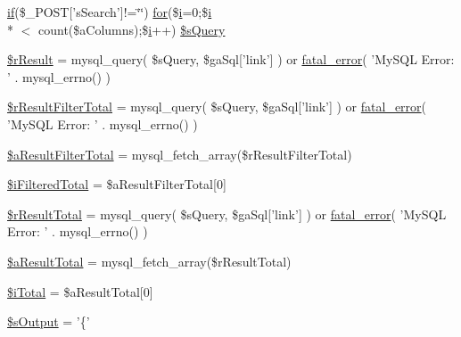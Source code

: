\begin{DoxyCompactItemize}
\item 
\hyperlink{fullpage_2plugin_8js_a8b98017e64ef036adb9ae327ff94abe1}{if}(\$\+\_\+\+P\+O\+S\+T\mbox{[}'s\+Search'\mbox{]}!=\char`\"{}\char`\"{}) \hyperlink{tinymce_8jquery_8dev_8js_a4675a875b20881bc5f7011f49fbd4da7}{for}(\$\hyperlink{validate_8js_a5e25b1d1bed9ab5f3174b76d6a722180}{i}=0;\$\hyperlink{validate_8js_a5e25b1d1bed9ab5f3174b76d6a722180}{i}\\*
$<$ count(\$a\+Columns);\$\hyperlink{validate_8js_a5e25b1d1bed9ab5f3174b76d6a722180}{i}++) \hyperlink{post_8php_a5175d5486118502db3f7aa1ccf7029cc}{\$s\+Query}
\item 
\hyperlink{post_8php_a8f423fcb1764890d70da997a4140f703}{\$r\+Result} = mysql\+\_\+query( \$s\+Query, \$ga\+Sql\mbox{[}'link'\mbox{]} ) or \hyperlink{examples_2server__side_2scripts_2server__processing_8php_a1bb235f2e57f0389e14b11592d32119a}{fatal\+\_\+error}( 'My\+S\+Q\+L Error\+: ' . mysql\+\_\+errno() )
\item 
\hyperlink{post_8php_a29b3b8a9782e4c5b8157be2ba70a33e1}{\$r\+Result\+Filter\+Total} = mysql\+\_\+query( \$s\+Query, \$ga\+Sql\mbox{[}'link'\mbox{]} ) or \hyperlink{examples_2server__side_2scripts_2server__processing_8php_a1bb235f2e57f0389e14b11592d32119a}{fatal\+\_\+error}( 'My\+S\+Q\+L Error\+: ' . mysql\+\_\+errno() )
\item 
\hyperlink{post_8php_a56c6da767ba5c9ca3c5f0c103dfaa77d}{\$a\+Result\+Filter\+Total} = mysql\+\_\+fetch\+\_\+array(\$r\+Result\+Filter\+Total)
\item 
\hyperlink{post_8php_a48dbbdca4a5a8b8d03ef6c76dd65a5c1}{\$i\+Filtered\+Total} = \$a\+Result\+Filter\+Total\mbox{[}0\mbox{]}
\item 
\hyperlink{post_8php_a48722b6bbefe9d4cb748bf0c3f936272}{\$r\+Result\+Total} = mysql\+\_\+query( \$s\+Query, \$ga\+Sql\mbox{[}'link'\mbox{]} ) or \hyperlink{examples_2server__side_2scripts_2server__processing_8php_a1bb235f2e57f0389e14b11592d32119a}{fatal\+\_\+error}( 'My\+S\+Q\+L Error\+: ' . mysql\+\_\+errno() )
\item 
\hyperlink{post_8php_ab01fea9c7d5ce59f138eabb6206fe6b8}{\$a\+Result\+Total} = mysql\+\_\+fetch\+\_\+array(\$r\+Result\+Total)
\item 
\hyperlink{post_8php_a7ba288b7060e9fe77272bafe66c2403d}{\$i\+Total} = \$a\+Result\+Total\mbox{[}0\mbox{]}
\item 
\hyperlink{post_8php_adf56804a2d67484675d7c58124c24385}{\$s\+Output} = '\{'
\end{DoxyCompactItemize}


